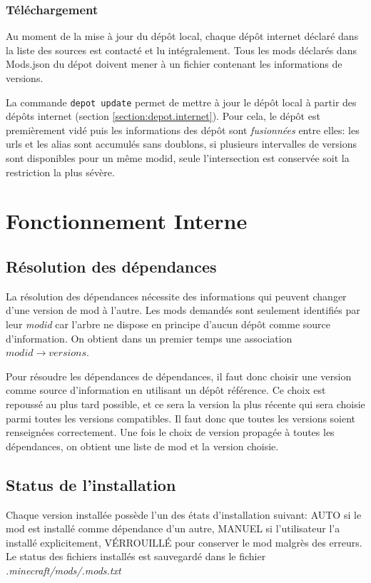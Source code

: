 \documentclass{article}
\begin{document}
\subsubsection{Téléchargement}
Au moment de la mise à jour du dépôt local, chaque dépôt internet déclaré dans la liste des sources est contacté et lu intégralement.
Tous les mods déclarés dans \textsf{Mods.json} du dépot doivent mener à un fichier contenant les informations de versions.

La commande \texttt{depot update} permet de mettre à jour le dépôt local à partir des dépôts internet (section \ref{section:depot.internet}).
Pour cela, le dépôt est premièrement vidé puis les informations des dépôt sont \textit{fusionnées} entre elles: les urls et les alias sont accumulés sans doublons, si plusieurs intervalles de versions sont disponibles pour un même modid, seule l'intersection est conservée soit la restriction la plus sévère.

%
%
\section{Fonctionnement Interne}
\subsection{Résolution des dépendances}
La résolution des dépendances nécessite des informations qui peuvent changer d'une version de mod à l'autre.
Les mods demandés sont seulement identifiés par leur \textit{modid} car l'arbre ne dispose en principe d'aucun dépôt comme source d'information.
On obtient dans un premier temps une association $modid \rightarrow versions$.

Pour résoudre les dépendances de dépendances, il faut donc choisir une version comme source d'information en utilisant un dépôt référence.
Ce choix est repoussé au plus tard possible, et ce sera la version la plus récente qui sera choisie parmi toutes les versions compatibles.
Il faut donc que toutes les versions soient renseignées correctement.
Une fois le choix de version propagée à toutes les dépendances, on obtient une liste de mod et la version choisie.

\subsection{Status de l'installation}
Chaque version installée possède l'un des états d'installation suivant: AUTO si le mod est installé comme dépendance d'un autre, MANUEL si l'utilisateur l'a installé explicitement, VÉRROUILLÉ pour conserver le mod malgrès des erreurs.
Le status des fichiers installés est sauvegardé dans le fichier \textit{.minecraft/mods/.mods.txt}
\end{document}
